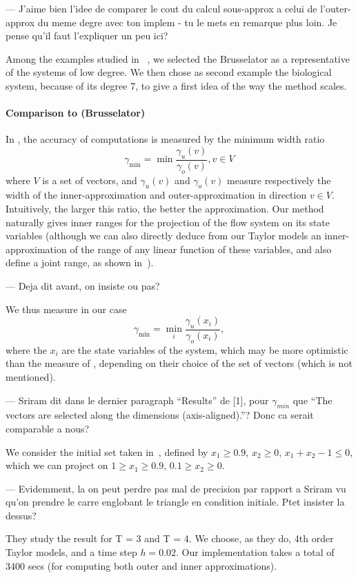 \documentclass{sig-alternate-05-2015} %
\newcommand\ForAuthors[1]%
 {\par\smallskip                     %
  \begin{center}%
   \fbox%
   {\parbox{0.9\linewidth}%
    {\raggedright\sc--- #1}%
   }%
  \end{center}%
  \par\smallskip                     %
 }
\begin{document}
\ForAuthors{J'aime bien l'idee de comparer le cout du calcul sous-approx
a celui de l'outer-approx du meme degre avec ton implem - tu le mets en
remarque plus loin. Je pense qu'il faut l'expliquer un peu ici?}

Among the examples studied in ~\cite{Underapproxflowpipes,underapprox16}, we selected
the Brusselator as a representative of the systems of low degree. 
We then chose as second example the biological system, because of its degree 7, to give a first idea of the way the method scales. 

\paragraph{Comparison to \cite{Underapproxflowpipes} (Brusselator)}
In  \cite{Underapproxflowpipes}, the  accuracy of computations is measured by the minimum width ratio 
\[ \gamma_{\min}=\min{\frac{\gamma_u(v)}{\gamma_o(v)}}, v \in V \]
where $V$ is a set of vectors, and $\gamma_u(v)$ and $\gamma_o(v)$ measure respectively the width of the inner-approximation and outer-approximation
in direction $v \in V$. 
Intuitively, the larger this ratio, the better the approximation. 
Our method naturally gives inner ranges for the projection of the flow system on its state variables (although we can also directly deduce from our Taylor models 
an inner-approximation of the range of any linear function of these variables, and also define a joint range, as shown in~\cite{hscc14,rc13}).
\ForAuthors{Deja dit avant, on insiste ou pas?} 
We thus measure in our case \[ \gamma_{\min}=\min_{i}{\frac{\gamma_u(x_i)}{\gamma_o(x_i)}}, \]
where the $x_i$ are the state variables of the system, which may be more optimistic than the measure of \cite{Underapproxflowpipes}, depending on their choice 
of the set of vectors (which is not mentioned). 

\ForAuthors{Sriram dit dans le dernier paragraph ``Results'' de [1], 
pour $\gamma_{min}$ que ``The vectors are selected along the dimensions
(axis-aligned).''? Donc ca serait comparable a nous?}

We consider the initial set taken in~\cite{Underapproxflowpipes}, defined by 
$x_1 \geq 0.9$, $x_2 \geq 0$, $x_1+x_2-1 \leq 0$, which we can project on $1 \geq x_1 \geq 0.9$, $0.1 \geq x_2 \geq 0$.
\ForAuthors{Evidemment, la on peut perdre pas mal de precision par rapport
a Sriram vu qu'on prendre le carre englobant le triangle en condition initiale. Ptet insister la dessus?}
They study the result for T = 3 and T = 4. We choose, as they do, 4th order Taylor models, and a time step $h=0.02$. 
Our implementation takes a total of 3400 secs (for computing both outer and inner approximations).
\end{document}
